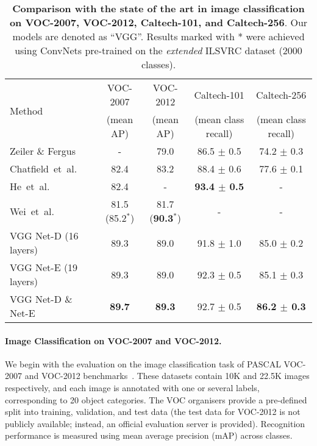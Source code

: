 \documentclass{article} %
\makeatletter
\newcommand*{\etal}{et~al.\@\xspace}
\makeatother
\begin{document}
\begin{table}[htb]
\setlength{\tabcolsep}{2pt}
\small
\centering
\caption{\textbf{Comparison with the state of the art in image classification on VOC-2007, VOC-2012, Caltech-101, and Caltech-256}.
Our models are denoted as ``VGG''. 
Results marked with * were achieved using \mbox{ConvNets} pre-trained on the \emph{extended} ILSVRC dataset (2000 classes).
}
\begin{tabular}{|l|c|c|c|c|} \hline
\multirow{2}{*}{Method} & VOC-2007 & VOC-2012 & Caltech-101 & Caltech-256  \\ 
& (mean AP) & (mean AP) & (mean class recall) & (mean class recall) \\ \hline
Zeiler \& Fergus~\citep{Zeiler13} & - & 79.0 & 86.5 $\pm$ 0.5 & 74.2 $\pm$ 0.3 \\ 
Chatfield~\etal~\citep{Chatfield14} & 82.4 & 83.2 & 88.4 $\pm$ 0.6 & 77.6 $\pm$ 0.1 \\ 
He~\etal~\citep{He14} & 82.4 & - & \textbf{93.4 $\pm$ 0.5} & - \\ 
Wei~\etal~\citep{Wei14} & 81.5 (85.2$^*$) & 81.7 (\textbf{90.3$^*$}) & - & - \\ \hline\hline
VGG Net-D (16 layers) & 89.3 & 89.0 & 91.8 $\pm$ 1.0 & 85.0 $\pm$ 0.2 \\ 
VGG Net-E (19 layers) & 89.3 & 89.0 & 92.3 $\pm$ 0.5 & 85.1 $\pm$ 0.3 \\
VGG Net-D \& Net-E & \textbf{89.7} & \textbf{89.3} & 92.7 $\pm$ 0.5 & \textbf{86.2 $\pm$ 0.3} \\ \hline
\end{tabular}
\label{tab:generalise_class}
\end{table}

\paragraph{Image Classification on VOC-2007 and VOC-2012.}
We begin with the evaluation on the image classification task of PASCAL VOC-2007 and VOC-2012 benchmarks~\citep{Everingham15}. These datasets contain 10K and 22.5K images respectively, and each image is annotated with one or several labels, corresponding to 20 object categories. The VOC organisers provide a pre-defined split into training, validation, and test data (the test data for VOC-2012 is not publicly available; instead, an official evaluation server is provided). Recognition performance is measured using mean average precision (mAP) across classes.
\end{document}
